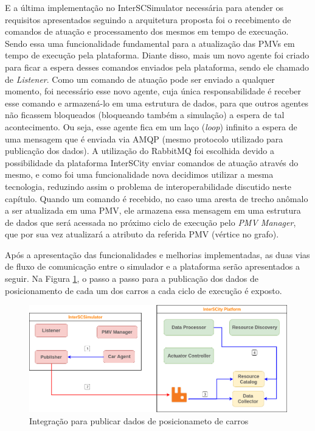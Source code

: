 E a última implementação no InterSCSimulator necessária para atender os requisitos apresentados seguindo a arquitetura proposta foi o recebimento de comandos de atuação e
processamento dos mesmos em tempo de execuação.
Sendo essa uma funcionalidade fundamental para a atualização das PMVs em tempo de execução pela plataforma.
Diante disso, mais um novo agente foi criado para ficar a espera desses comandos enviados pela plataforma, sendo ele chamado de \textit{Listener}.
Como um comando de atuação pode ser enviado a qualquer momento, foi necessário esse novo agente, cuja única responsabilidade é receber esse comando e armazená-lo em uma
estrutura de dados, para que outros agentes não ficassem bloqueados (bloqueando também a simulação) a espera de tal acontecimento.
Ou seja, esse agente fica em um laço (\textit{loop}) infinito a espera de uma mensagem que é enviada via AMQP (mesmo protocolo utilizado para publicação dos dados).
A utilização do RabbitMQ foi escolhida devido a possibilidade da plataforma InterSCity enviar comandos de atuação através do mesmo, e como foi uma funcionalidade nova
decidimos utilizar a mesma tecnologia, reduzindo assim o problema de interoperabilidade discutido neste capítulo.
Quando um comando é recebido, no caso uma aresta de trecho anômalo a ser atualizada em uma PMV, ele armazena essa mensagem em uma estrutura de dados que será acessada no
próximo ciclo de execução pelo \textit{PMV Manager}, que por sua vez atualizará a atributo da referida PMV (vértice no grafo).

Após a apresentação das funcionalidades e melhorias implementadas, as duas vias de fluxo de comunicação entre o simulador e a plataforma serão apresentados a seguir.
Na Figura \ref{fig:smart_traffic_publish_data}, o passo a passo para a publicação dos dados de posicionamento de cada um dos carros a cada ciclo de execução é exposto.

\begin{figure}[ht]
	\centering
	\includegraphics[width=\textwidth]{figuras/integration-publish-car-position.png}
	\caption{Integração para publicar dados de posicionameto de carros}
	\label{fig:smart_traffic_publish_data}
\end{figure}

